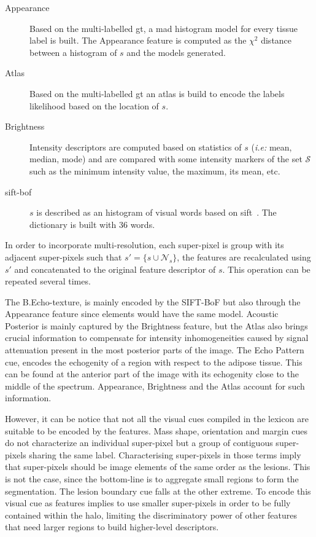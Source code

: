 \begin{description}
  \item[Appearance] 
    Based on the multi-labelled \ac{gt}, a \ac{mad} histogram model for every tissue label is built. The Appearance feature is computed as the $\chi^2$ distance between a histogram of $s$ and the models generated.
  \item[Atlas] 
    Based on the multi-labelled \ac{gt} an atlas is build to encode the labels likelihood based on the location of $s$.
  \item[Brightness] 
    Intensity descriptors are computed based on statistics of $s$ (\emph{i.e:} mean, median, mode) and  are compared with some intensity markers of the set $\mathcal{S}$ such as the minimum intensity value, the maximum, its mean, etc.
  \item[\ac{sift}-\ac{bof}]
    $s$ is described as an histogram of visual words based on \ac{sift}~\cite{massich2014sift}. The dictionary is built with $36$ words.
\end{description}

In order to incorporate multi-resolution, each super-pixel is group with its adjacent super-pixels such that $s' = \{s \cup \mathcal{N}_{s}\}$, the features are recalculated using $s'$ and concatenated to the original feature descriptor of $s$.
This operation can be repeated several times.

The B.Echo-texture, is mainly encoded by the SIFT-BoF but also through the Appearance feature since elements would have the same model.
Acoustic Posterior is mainly captured by the Brightness feature, but the Atlas also brings crucial information to compensate for intensity inhomogeneities caused by signal attenuation present in the most posterior parts of the image.
The Echo Pattern cue, encodes the echogenity of a region with respect to the adipose tissue. This can be found at the anterior part of the image with its echogenity close to the middle of the spectrum. Appearance, Brightness and the Atlas account for such information.

However, it can be notice that not all the visual cues compiled in the lexicon are suitable to be encoded by the features.
Mass shape, orientation and margin cues do not characterize an individual super-pixel but a group of contiguous super-pixels sharing the same label.
Characterising super-pixels in those terms imply that super-pixels should be image elements of the same order as the lesions. 
This is not the case, since the bottom-line is to aggregate small regions to form the segmentation.
The lesion boundary cue falls at the other extreme.
To encode this visual cue as features implies to use smaller super-pixels in order to be fully contained within the halo, limiting the discriminatory power of other features that need larger regions to build higher-level descriptors.

